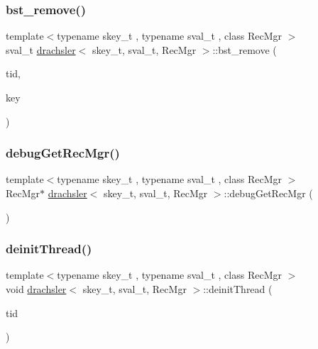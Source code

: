 \subsubsection{\texorpdfstring{bst\+\_\+remove()}{bst\_remove()}}
{\footnotesize\ttfamily template$<$typename skey\+\_\+t , typename sval\+\_\+t , class Rec\+Mgr $>$ \\
sval\+\_\+t \hyperlink{classdrachsler}{drachsler}$<$ skey\+\_\+t, sval\+\_\+t, Rec\+Mgr $>$\+::bst\+\_\+remove (\begin{DoxyParamCaption}\item[{const int}]{tid,  }\item[{skey\+\_\+t}]{key }\end{DoxyParamCaption})}

\mbox{\label{classdrachsler_a11f6ed9e888d2d5328fd97e9c0901d70}} 
\subsubsection{\texorpdfstring{debug\+Get\+Rec\+Mgr()}{debugGetRecMgr()}}
{\footnotesize\ttfamily template$<$typename skey\+\_\+t , typename sval\+\_\+t , class Rec\+Mgr $>$ \\
Rec\+Mgr$\ast$ \hyperlink{classdrachsler}{drachsler}$<$ skey\+\_\+t, sval\+\_\+t, Rec\+Mgr $>$\+::debug\+Get\+Rec\+Mgr (\begin{DoxyParamCaption}{ }\end{DoxyParamCaption})\hspace{0.3cm}{\ttfamily [inline]}}

\mbox{\label{classdrachsler_a9f2a70d4fa52ccc1057f00ef1e68ee29}} 
\subsubsection{\texorpdfstring{deinit\+Thread()}{deinitThread()}}
{\footnotesize\ttfamily template$<$typename skey\+\_\+t , typename sval\+\_\+t , class Rec\+Mgr $>$ \\
void \hyperlink{classdrachsler}{drachsler}$<$ skey\+\_\+t, sval\+\_\+t, Rec\+Mgr $>$\+::deinit\+Thread (\begin{DoxyParamCaption}\item[{const int}]{tid }\end{DoxyParamCaption})\hspace{0.3cm}{\ttfamily [inline]}}


